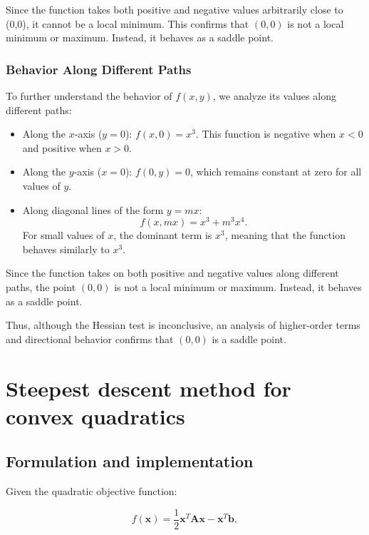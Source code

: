 \documentclass[12pt]{article}
\begin{document}
Since the function takes both positive and negative values arbitrarily close to (0,0), it cannot be a local minimum. This confirms that \( (0,0) \) is not a local minimum or maximum. Instead, it behaves as a saddle point.

\subsubsection{Behavior Along Different Paths}

To further understand the behavior of \( f(x,y) \), we analyze its values along different paths:

\begin{itemize}
    \item Along the \( x \)-axis (\( y = 0 \)): \( f(x, 0) = x^3 \). This function is negative when \( x < 0 \) and positive when \( x > 0 \).
    \item Along the \( y \)-axis (\( x = 0 \)): \( f(0, y) = 0 \), which remains constant at zero for all values of \( y \).
    \item Along diagonal lines of the form \( y = mx \):  
    \[
    f(x, mx) = x^3 + m^3 x^4.
    \]
    For small values of \( x \), the dominant term is \( x^3 \), meaning that the function behaves similarly to \( x^3 \).
\end{itemize}

Since the function takes on both positive and negative values along different paths, the point \( (0,0) \) is not a local minimum or maximum. Instead, it behaves as a saddle point.

Thus, although the Hessian test is inconclusive, an analysis of higher-order terms and directional behavior confirms that \( (0,0) \) is a saddle point.

\newpage

\section{Steepest descent method for convex quadratics}

\subsection{Formulation and implementation}
Given the quadratic objective function:

\[
f(\mathbf{x}) = \frac{1}{2} \mathbf{x}^T \mathbf{A} \mathbf{x} -\mathbf{x}^T \mathbf{b},
\]
\end{document}
